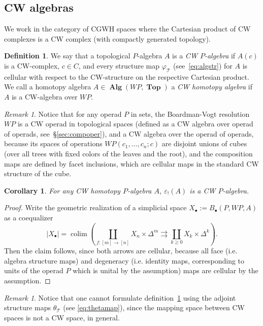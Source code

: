 \documentclass{amsart}
\newtheorem{corollary}[formula]{Corollary}
\theoremstyle{definition}
\newtheorem{definition}[formula]{Definition}
\theoremstyle{remark}
\newtheorem{remark}[formula]{Remark}
\newcommand{\eps}{\varepsilon}
\DeclareMathOperator{\col}{colim}
\DeclareMathOperator{\Top}{\mathbf{Top}}
\DeclareMathOperator{\Alg}{\mathbf{Alg}}
\renewcommand{\ge}{\geqslant}
\renewcommand{\phi}{\varphi}
\begin{document}
	\subsection{CW algebras}\label{ssec:cw}
	
	We work in the category of CGWH spaces where the Cartesian product of CW complexes is a CW complex (with compactly generated topology).
	
	\begin{definition}\label{def:cwhalg}
		We say that a topological $P$-algebra $A$ is a \textit{CW $P$-algebra} if $A(c)$ is a CW-complex, $c\in C$, and every structure map $\phi_{\mathcal{T}}$ (see~\eqref{eq:algstr}) for $A$ is cellular with respect to the CW-structure on the respective Cartesian product.
		We call a homotopy algebra $A\in\Alg(WP,\Top)$ a \textit{CW homotopy algebra} if $A$ is a CW-algebra over $WP$.
	\end{definition}
	
	\begin{remark}
		Notice that for any operad $P$ in sets, the Boardman-Vogt resolution $WP$ is a CW operad in topological spaces (defined as a CW algebra over operad of operads, see~\S\ref{sec:compoper}), and a CW algebra over the operad of operads, because its spaces of operations $WP(c_{1},\dots,c_{n};c)$ are disjoint unions of cubes (over all trees with fixed colors of the leaves and the root), and the composition maps are defined by facet inclusions, which are cellular maps in the standard CW structure of the cube.
	\end{remark}
	
	\begin{corollary}\label{cor:algrect}
		For any CW homotopy $P$-algebra $A$, $\eps_{!}(A)$ is a CW $P$-algebra.
	\end{corollary}
	\begin{proof}
		Write the geometric realization of a simplicial space $X_{\bullet}:=B_{\bullet}(P,WP,A)$ as a coequalizer
		\[ 
		|X_{\bullet}|=
		\col \left( \coprod_{f \colon [m] \to [n]} X_{n} \times 	\Delta^m \rightrightarrows \coprod_{k \ge 0} X_{k} \times \Delta^k \right).
		\]
		Then the claim follows, since both arrows are cellular, because all face (i.e. algebra structure maps) and degeneracy (i.e. identity maps, corresponding to units of the operad $P$ which is unital by the assumption) maps are cellular by the assumption.
	\end{proof}
	
	\begin{remark}
		Notice that one cannot formulate definition~\ref{def:cwhalg} using the adjoint structure maps $\theta_{\mathcal{T}}$ (see \eqref{eq:thetamap}), since the mapping space between CW spaces is not a CW space, in general.
	\end{remark}
	
\end{document}
